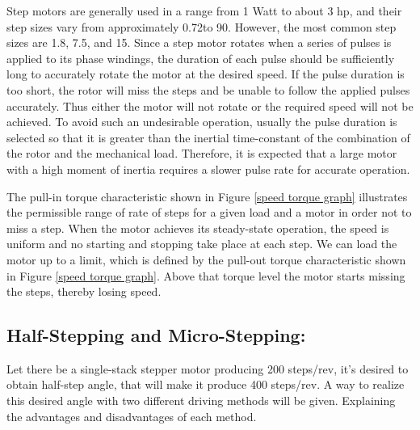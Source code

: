 \documentclass[journal]{IEEEtran}
\begin{document}
Step motors are generally used in a range from 1 Watt to about 3 hp, and their step sizes vary from approximately 0.72\textdegree to 90\textdegree. However, the most common step sizes are 1.8\textdegree, 7.5\textdegree, and 15\textdegree. 
Since a step motor rotates when a series of pulses is applied to its phase windings, the duration of each pulse should be sufficiently long to accurately rotate the motor at the desired speed. If the pulse duration is too short, the rotor will miss the steps and be unable to follow the applied pulses accurately. Thus either the motor will not rotate or the required speed will not be achieved. To avoid such an undesirable operation, usually the pulse duration is selected so that it is greater than the inertial time-constant of the combination of the rotor and the mechanical load. Therefore, it is expected that a large motor with a high moment of inertia requires a slower pulse rate for accurate operation. 

The pull-in torque characteristic shown in Figure \ref{speed torque graph} illustrates the permissible range of rate of steps for a given load and a motor in order not to miss a step. When the motor achieves its steady-state operation, the speed is uniform and no starting and stopping take place at each step. We can load the motor up to a limit, which is defined by the pull-out torque characteristic shown in Figure \ref{speed torque graph}. Above that torque level the motor starts missing the steps, thereby losing speed. \cite{guru2007}







\subsection{Half-Stepping and Micro-Stepping:}


Let there be a single-stack stepper motor producing 200 steps/rev, it’s desired to obtain half-step angle, that will make it produce 400 steps/rev. A way to realize this desired angle with two different driving methods will be given. Explaining the advantages and disadvantages of each method.
\end{document}
